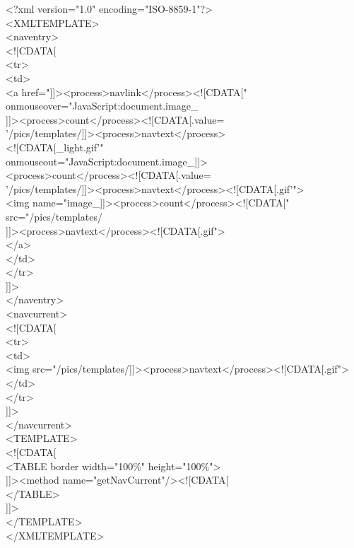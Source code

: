 \begin{xml}
<?xml version="1.0" encoding="ISO-8859-1"?> \\
<XMLTEMPLATE> \\

<naventry> \\
<![CDATA[ \\
<tr> \\
\xtaba <td> \\
\xtabb   <a href="]]><process>navlink</process><![CDATA[" \\
\xtabc   onmouseover="JavaScript:document.image\_ \\
\xtabc   ]]><process>count</process><![CDATA[.value= \\
\xtabc   '/pics/templates/]]><process>navtext</process> \\
\xtabc   <![CDATA[\_light.gif'" \\
\xtabc   onmouseout="JavaScript:document.image\_]]> \\
\xtabc   <process>count</process><![CDATA[.value= \\
\xtabc   '/pics/templates/]]><process>navtext</process><![CDATA[.gif'"> \\
\xtabc   <img name="image\_]]><process>count</process><![CDATA[" \\
\xtabc   src="/pics/templates/ \\
\xtabc   ]]><process>navtext</process><![CDATA[.gif"> \\
\xtabb   </a> \\
\xtaba </td> \\
</tr> \\
]]> \\
</naventry> \\

<navcurrent> \\
<![CDATA[ \\
<tr> \\
\xtaba  <td> \\
\xtabb    <img src="/pics/templates/]]><process>navtext</process><![CDATA[.gif"> \\
\xtaba  </td> \\
</tr> \\
]]> \\
</navcurrent> \\

<TEMPLATE> \\
<![CDATA[ \\
<TABLE border width="100\%" height="100\%"> \\
\xtaba  ]]><method name="getNavCurrent"/><![CDATA[ \\
</TABLE> \\
]]> \\
</TEMPLATE> \\

</XMLTEMPLATE> \\
\end{xml}


